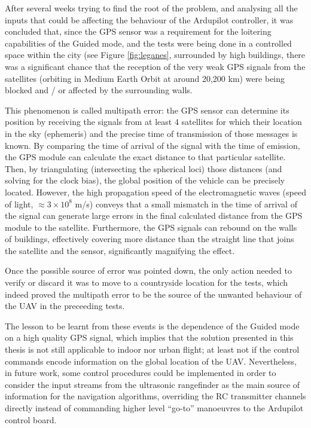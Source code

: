 After several weeks trying to find the root of the problem, and analysing all the inputs that could be affecting the behaviour of the Ardupilot controller, it was concluded that, since the GPS sensor was a requirement for the loitering capabilities of the Guided mode, and the tests were being done in a controlled space within the city (see Figure \ref{fig:leganes}, surrounded by high buildings, there was a significant chance that the reception of the very weak GPS signals from the satellites (orbiting in Medium Earth Orbit at around 20,200 km) were being blocked and / or affected by the surrounding walls.



This phenomenon is called multipath error: the GPS sensor can determine its position by receiving the signals from at least 4 satellites for which their location in the sky (ephemeris) and the precise time of transmission of those messages is known.
By comparing the time of arrival of the signal with the time of emission, the GPS module can calculate the exact distance to that particular satellite.
Then, by triangulating (intersecting the spherical loci) those distances (and solving for the clock bias), the global position of the vehicle can be precisely located.
However, the high propagation speed of the electromagnetic waves (speed of light, $\approx 3\times 10^8$ m/s) conveys that a small mismatch in the time of arrival of the signal can generate large errors in the final calculated distance from the GPS module to the satellite.
Furthermore, the GPS signals can rebound on the walls of buildings, effectively covering more distance than the straight line that joins the satellite and the sensor, significantly magnifying the effect.

Once the possible source of error was pointed down, the only action needed to verify or discard it was to move to a countryside location for the tests, which indeed proved the multipath error to be the source of the unwanted behaviour of the UAV in the preceeding tests.

The lesson to be learnt from these events is the dependence of the Guided mode on a high quality GPS signal, which implies that the solution presented in this thesis is not still applicable to indoor nor urban flight; at least not if the control commands encode information on the global location of the UAV.
Nevertheless, in future work, some control procedures could be implemented in order to consider the input streams from the ultrasonic rangefinder as the main source of information for the navigation algorithms, overriding the RC transmitter channels directly instead of commanding higher level ``go-to'' manoeuvres to the Ardupilot control board.

